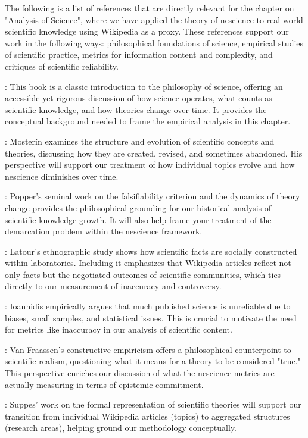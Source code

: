 The following is a list of references that are directly relevant for the chapter on "Analysis of Science", where we have applied the theory of nescience to real-world scientific knowledge using Wikipedia as a proxy. These references support our work in the following ways: philosophical foundations of science, empirical studies of scientific practice, metrics for information content and complexity, and critiques of scientific reliability.

\cite{chalmers2013thing}: This book is a classic introduction to the philosophy of science, offering an accessible yet rigorous discussion of how science operates, what counts as scientific knowledge, and how theories change over time. It provides the conceptual background needed to frame the empirical analysis in this chapter.

\cite{mosterin2016conceptos}: Mosterín examines the structure and evolution of scientific concepts and theories, discussing how they are created, revised, and sometimes abandoned. His perspective will support our treatment of how individual topics evolve and how nescience diminishes over time.

\cite{popper2014conjectures}: Popper's seminal work on the falsifiability criterion and the dynamics of theory change provides the philosophical grounding for our historical analysis of scientific knowledge growth. It will also help frame your treatment of the demarcation problem within the nescience framework.

\cite{latour2013laboratory}: Latour's ethnographic study shows how scientific facts are socially constructed within laboratories. Including it emphasizes that Wikipedia articles reflect not only facts but the negotiated outcomes of scientific communities, which ties directly to our measurement of inaccuracy and controversy.

\cite{ioannidis2005most}: Ioannidis empirically argues that much published science is unreliable due to biases, small samples, and statistical issues. This is crucial to motivate the need for metrics like inaccuracy in our analysis of scientific content.

\cite{van1980scientific}: Van Fraassen's constructive empiricism offers a philosophical counterpoint to scientific realism, questioning what it means for a theory to be considered "true." This perspective enriches our discussion of what the nescience metrics are actually measuring in terms of epistemic commitment.

\cite{suppes2002representation}: Suppes' work on the formal representation of scientific theories will support our transition from individual Wikipedia articles (topics) to aggregated structures (research areas), helping ground our methodology conceptually.

